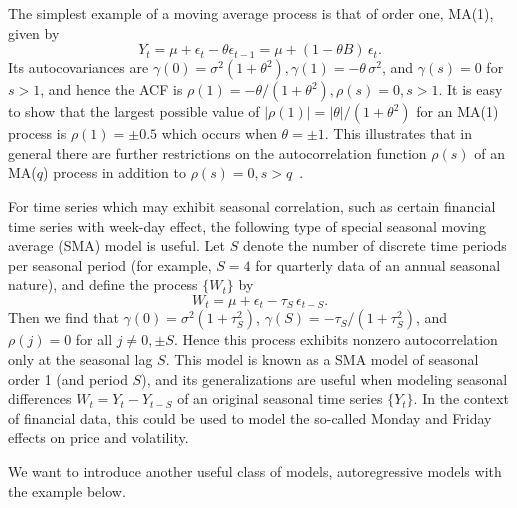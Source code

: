 \begin{ex} \label{ex:movingorder1}
The simplest example of a moving average process is that of order one, MA(1), given by
	\[
	Y_t = \mu + \epsilon_t - \theta \epsilon_{t-1}= \mu + (1 - \theta B)\, \epsilon_t.
	 \]
Its autocovariances are $\gamma(0)= \sigma^2 (1 + \theta^2), \gamma(1)= -\theta\, \sigma^2$, and $\gamma(s)= 0$ for $s > 1$, and hence the ACF is $\rho(1)= -\theta / (1+\theta^2), \rho(s)= 0, s > 1$. It is easy to show that the largest possible value of $\left| \rho(1) \right|= \left| \theta \right| / (1+\theta^2)$ for an  MA(1) process is $\rho(1)= \pm 0.5$ which occurs when $\theta = \pm 1$. This illustrates that in general there are further restrictions on the autocorrelation function $\rho(s)$ of an MA($q$)  process in addition to $\rho(s)= 0, s > q$~.~\xqed
\end{ex}
    

\begin{ex} \label{ex:seasonal} 
For time series which may exhibit seasonal correlation, such as certain financial time series with week-day effect, the following type of special seasonal moving average (SMA) model is useful. Let $S$ denote the number of discrete time periods per seasonal period (for example, $S= 4$ for quarterly data of an annual seasonal nature), and define the process $\{ W_t \}$ by
	\[	
	W_t = \mu + \epsilon_t - \tau_S \, \epsilon_{t-S}.
	\]
Then we find that $\gamma(0)= \sigma^2 (1+\tau_S^2)$, $\gamma(S) = - \tau_S / (1+\tau_S^2)$,  and $\rho(j)= 0$ for all $j \neq 0, \pm S$. Hence this process exhibits nonzero autocorrelation only at the seasonal lag $S$. This model is known as a SMA model of seasonal order 1 (and period $S$), and its generalizations are useful when modeling seasonal differences $W_t = Y_t - Y_{t-S}$ of an original seasonal time series $\{ Y_t \}$.  In the context of financial data, this could be used to model the so-called Monday and Friday effects on price and volatility. \xqed
\end{ex}      


We want to introduce another useful class of models, autoregressive models with the example below.


